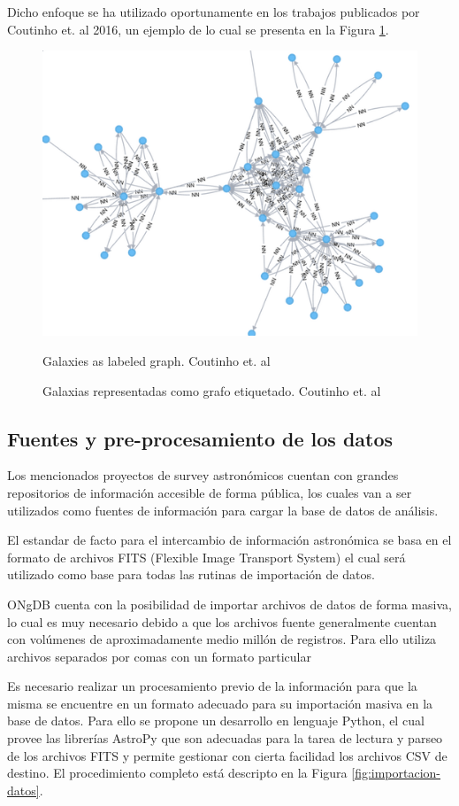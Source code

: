 	Dicho enfoque se ha utilizado oportunamente en los trabajos publicados por Coutinho et. al 2016\cite{coutinho2016network}, un ejemplo de lo cual se presenta en la Figura \ref{fig:galaxies-as-graph}.
	
	\begin{figure}[h]
		\centering
		\includegraphics[width=0.7\linewidth]{./images/galaxies-graph-visualization-small}
		\ifdefined\ingles
			\caption{Galaxies as labeled graph. Coutinho et. al}
		\else
			\caption{Galaxias representadas como grafo etiquetado. Coutinho et. al}
		\fi
		\label{fig:galaxies-as-graph}
	\end{figure}
	
	
	\subsection{Fuentes y pre-procesamiento de los datos}\label{sec:fuentes-preprocesamiento}
	
	Los mencionados proyectos de survey astronómicos cuentan con grandes repositorios de información accesible de forma pública, los cuales van a ser utilizados como fuentes de información para cargar la base de datos de análisis.
	
	El estandar de facto para el intercambio de información astronómica se basa en el formato de archivos FITS (Flexible Image Transport System\cite{hanisch2001definition}) el cual será utilizado como base para todas las rutinas de importación de datos.
	
	ONgDB cuenta con la posibilidad de importar archivos de datos de forma masiva, lo cual es muy necesario debido a que los archivos fuente generalmente cuentan con volúmenes de aproximadamente medio millón de registros. Para ello utiliza archivos separados por comas con un formato particular 
	
	Es necesario realizar un procesamiento previo de la información para que la misma se encuentre en un formato adecuado para su importación masiva en la base de datos. Para ello se propone un desarrollo en lenguaje Python, el cual provee las librerías AstroPy\cite{robitaille2013astropy} que son adecuadas para la tarea de lectura y parseo de los archivos FITS y permite gestionar con cierta facilidad los archivos CSV de destino. El procedimiento completo está descripto en la Figura \ref{fig:importacion-datos}.
	
